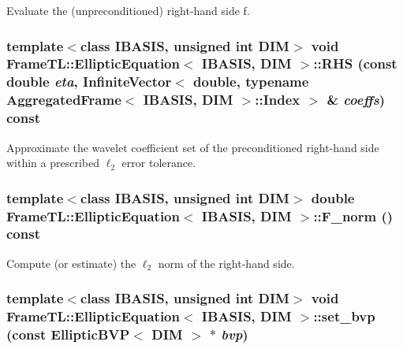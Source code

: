 Evaluate the (unpreconditioned) right-hand side f. \hypertarget{classFrameTL_1_1EllipticEquation_b0efc4d40ed2a12db9c8af7d195b210b}{
\subsubsection[RHS]{\setlength{\rightskip}{0pt plus 5cm}template$<$class IBASIS, unsigned int DIM$>$ void {\bf FrameTL::EllipticEquation}$<$ IBASIS, DIM $>$::RHS (const double {\em eta}, \/  InfiniteVector$<$ double, typename {\bf AggregatedFrame}$<$ IBASIS, DIM $>$::{\bf Index} $>$ \& {\em coeffs}) const}}
\label{classFrameTL_1_1EllipticEquation_b0efc4d40ed2a12db9c8af7d195b210b}


Approximate the wavelet coefficient set of the preconditioned right-hand side within a prescribed $\ell_2$ error tolerance. \hypertarget{classFrameTL_1_1EllipticEquation_1c6e0bd3bc27368aca7ea68c7baee8a1}{
\subsubsection[F\_\-norm]{\setlength{\rightskip}{0pt plus 5cm}template$<$class IBASIS, unsigned int DIM$>$ double {\bf FrameTL::EllipticEquation}$<$ IBASIS, DIM $>$::F\_\-norm () const}}
\label{classFrameTL_1_1EllipticEquation_1c6e0bd3bc27368aca7ea68c7baee8a1}


Compute (or estimate) the $\ell_2$ norm of the right-hand side. \hypertarget{classFrameTL_1_1EllipticEquation_c7183c7aeb7e3c34cddf3c3e9a79b96c}{
\subsubsection[set\_\-bvp]{\setlength{\rightskip}{0pt plus 5cm}template$<$class IBASIS, unsigned int DIM$>$ void {\bf FrameTL::EllipticEquation}$<$ IBASIS, DIM $>$::set\_\-bvp (const EllipticBVP$<$ DIM $>$ $\ast$ {\em bvp})}}
\label{classFrameTL_1_1EllipticEquation_c7183c7aeb7e3c34cddf3c3e9a79b96c}


